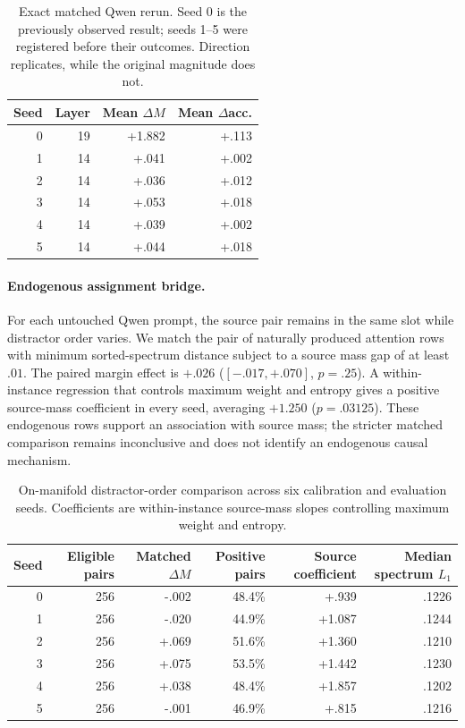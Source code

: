 \documentclass[letterpaper]{article} %
\begin{document}
\begin{table}[t]
\centering
\small
\setlength{\tabcolsep}{3.5pt}
\begin{tabular}{rrrr}
\toprule
Seed & Layer & Mean $\Delta M$ & Mean $\Delta$acc. \\
\midrule
0 & 19 & +1.882 & +.113 \\
1 & 14 & +.041 & +.002 \\
2 & 14 & +.036 & +.012 \\
3 & 14 & +.053 & +.018 \\
4 & 14 & +.039 & +.002 \\
5 & 14 & +.044 & +.018 \\
\bottomrule
\end{tabular}
\caption{Exact matched Qwen rerun. Seed 0 is the previously observed result; seeds 1--5 were registered before
their outcomes. Direction replicates, while the original magnitude does not.}
\label{tab:supp-qwen-exact}
\end{table}

\paragraph{Endogenous assignment bridge.}
For each untouched Qwen prompt, the source pair remains in the same slot while distractor order varies. We
match the pair of naturally produced attention rows with minimum sorted-spectrum distance subject to a source
mass gap of at least $.01$. The paired margin effect is $+.026$ ($[-.017,+.070]$, $p=.25$). A within-instance
regression that controls maximum weight and entropy gives a positive source-mass coefficient in every seed,
averaging $+1.250$ ($p=.03125$). These endogenous rows support an association with source mass;
the stricter matched comparison remains inconclusive and does not identify an endogenous causal mechanism.

\begin{table}[t]
\centering
\small
\setlength{\tabcolsep}{4.0pt}
\begin{tabular}{rrrrrr}
\toprule
Seed & Eligible pairs & Matched $\Delta M$ & Positive pairs & Source coefficient & Median spectrum $L_1$ \\
\midrule
0 & 256 & -.002 & 48.4\% & +.939 & .1226 \\
1 & 256 & -.020 & 44.9\% & +1.087 & .1244 \\
2 & 256 & +.069 & 51.6\% & +1.360 & .1210 \\
3 & 256 & +.075 & 53.5\% & +1.442 & .1230 \\
4 & 256 & +.038 & 48.4\% & +1.857 & .1202 \\
5 & 256 & -.001 & 46.9\% & +.815 & .1216 \\
\bottomrule
\end{tabular}
\caption{On-manifold distractor-order comparison across six calibration and evaluation seeds. Coefficients are
within-instance source-mass slopes controlling maximum weight and entropy.}
\label{tab:supp-endogenous}
\end{table}
\end{document}
